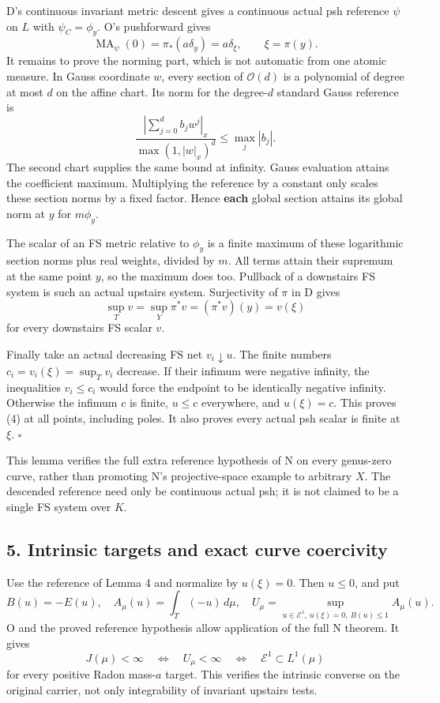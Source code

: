 \documentclass[
  11pt,
]{article}
\begin{document}
D's continuous invariant metric descent gives a continuous actual psh
reference \(\psi\) on \(L\) with \(\psi_C=\phi_y\). O's pushforward
gives \[
\operatorname{MA}_\psi(0)=\pi_*(a\delta_y)=a\delta_\xi,
\qquad \xi=\pi(y).
\] It remains to prove the norming part, which is not automatic from one
atomic measure. In Gauss coordinate \(w\), every section of
\(\mathcal O(d)\) is a polynomial of degree at most \(d\) on the affine
chart. Its norm for the degree-\(d\) standard Gauss reference is \[
\frac{|\sum_{j=0}^d b_jw^j|_x}{\max(1,|w|_x)^d}
\leq\max_j|b_j|.
\] The second chart supplies the same bound at infinity. Gauss
evaluation attains the coefficient maximum. Multiplying the reference by
a constant only scales these section norms by a fixed factor. Hence
\textbf{each} global section attains its global norm at \(y\) for
\(m\phi_y\).

The scalar of an FS metric relative to \(\phi_y\) is a finite maximum of
these logarithmic section norms plus real weights, divided by \(m\). All
terms attain their supremum at the same point \(y\), so the maximum does
too. Pullback of a downstairs FS system is such an actual upstairs
system. Surjectivity of \(\pi\) in D gives \[
\sup_T v=\sup_Y\pi^*v=(\pi^*v)(y)=v(\xi)
\] for every downstairs FS scalar \(v\).

Finally take an actual decreasing FS net \(v_i\downarrow u\). The finite
numbers \(c_i=v_i(\xi)=\sup_Tv_i\) decrease. If their infimum were
negative infinity, the inequalities \(v_i\leq c_i\) would force the
endpoint to be identically negative infinity. Otherwise the infimum
\(c\) is finite, \(u\leq c\) everywhere, and \(u(\xi)=c\). This proves
(4) at all points, including poles. It also proves every actual psh
scalar is finite at \(\xi\). \(\square\)

This lemma verifies the full extra reference hypothesis of N on every
genus-zero curve, rather than promoting N's projective-space example to
arbitrary \(X\). The descended reference need only be continuous actual
psh; it is not claimed to be a single FS system over \(K\).

\subsection{5. Intrinsic targets and exact curve
coercivity}\label{intrinsic-targets-and-exact-curve-coercivity}

Use the reference of Lemma 4 and normalize by \(u(\xi)=0\). Then
\(u\leq0\), and put \[
B(u)=-E(u),\quad A_\mu(u)=\int_T(-u)\,d\mu,\quad
U_\mu=\sup_{u\in\mathcal E^1,\ u(\xi)=0,\ B(u)\leq1}A_\mu(u).
\] O and the proved reference hypothesis allow application of the full N
theorem. It gives \[
J(\mu)<\infty\quad\Longleftrightarrow\quad U_\mu<\infty
\quad\Longleftrightarrow\quad
\mathcal E^1\subset L^1(\mu)
\tag{6}
\] for every positive Radon mass-\(a\) target. This verifies the
intrinsic converse on the original carrier, not only integrability of
invariant upstairs tests.
\end{document}
